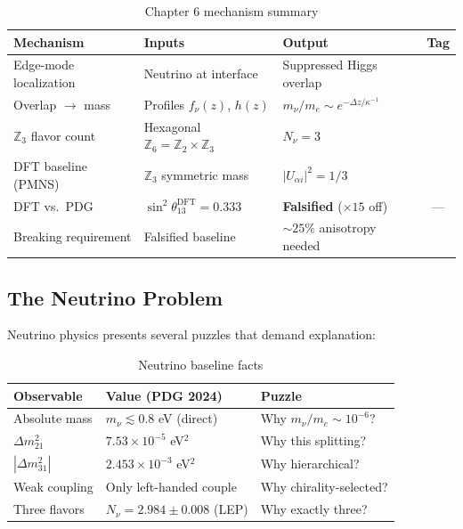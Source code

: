 
\begin{table}[ht]
\centering
\caption{Chapter 6 mechanism summary}
\label{tab:ch6_mechanism_summary}
\begin{tabular}{p{3.5cm}p{3.5cm}p{3.5cm}c}
\toprule
\textbf{Mechanism} & \textbf{Inputs} & \textbf{Output} & \textbf{Tag} \\
\midrule
Edge-mode localization & Neutrino at interface \tagP{} &
    Suppressed Higgs overlap & \tagDc{} \\
Overlap $\to$ mass & Profiles $f_\nu(z)$, $h(z)$ \tagP{} &
    $m_\nu/m_e \sim e^{-\Delta z/\kappa^{-1}}$ & \tagDc{} \\
$\mathbb{Z}_3$ flavor count & Hexagonal $\mathbb{Z}_6 = \mathbb{Z}_2 \times \mathbb{Z}_3$ &
    $N_\nu = 3$ & \tagI{} \\
DFT baseline (PMNS) & $\mathbb{Z}_3$ symmetric mass &
    $|U_{\alpha i}|^2 = 1/3$ & \tagDc{} \\
DFT vs.\ PDG & $\sin^2\theta_{13}^{\text{DFT}} = 0.333$ &
    \textbf{Falsified} ($\times 15$ off) & --- \\
Breaking requirement & Falsified baseline &
    $\sim 25\%$ anisotropy needed & \tagP{} \\
\bottomrule
\end{tabular}
\end{table}

\subsection{The Neutrino Problem}
\label{sec:ch6_problem}

Neutrino physics presents several puzzles that demand explanation:

\begin{table}[ht]
\centering
\caption{Neutrino baseline facts \tagBL{}}
\label{tab:ch6_baselines}
\begin{tabular}{lll}
\toprule
\textbf{Observable} & \textbf{Value (PDG 2024)} & \textbf{Puzzle} \\
\midrule
Absolute mass & $m_\nu \lesssim 0.8$ eV (direct) & Why $m_\nu/m_e \sim 10^{-6}$? \\
$\Delta m_{21}^2$ & $7.53 \times 10^{-5}$ eV$^2$ & Why this splitting? \\
$|\Delta m_{31}^2|$ & $2.453 \times 10^{-3}$ eV$^2$ & Why hierarchical? \\
Weak coupling & Only left-handed couple & Why chirality-selected? \\
Three flavors & $N_\nu = 2.984 \pm 0.008$ (LEP) & Why exactly three? \\
\bottomrule
\end{tabular}
\end{table}

